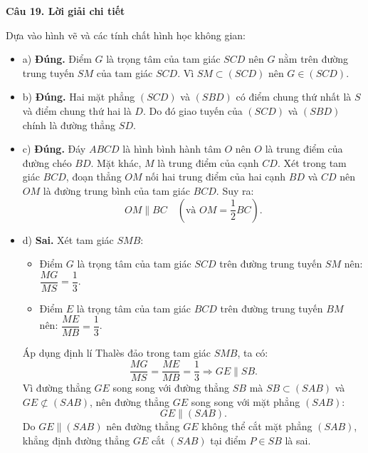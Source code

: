 \documentclass[12pt, a4paper]{article}
\begin{document}
\noindent\textbf{Câu 19. Lời giải chi tiết}\par
\begin{tcolorbox}[enhanced,breakable,colback=solutionbg,colframe=secondary!50!black,frame hidden,borderline west={3pt}{0pt}{secondary!50!black}]
Dựa vào hình vẽ và các tính chất hình học không gian:
\begin{itemize}[leftmargin=1.5em]
\item a) \textbf{Đúng.} Điểm $G$ là trọng tâm của tam giác $SCD$ nên $G$ nằm trên đường trung tuyến $SM$ của tam giác $SCD$. Vì $SM \subset (SCD)$ nên $G \in (SCD)$.

\item b) \textbf{Đúng.} Hai mặt phẳng $(SCD)$ và $(SBD)$ có điểm chung thứ nhất là $S$ và điểm chung thứ hai là $D$. Do đó giao tuyến của $(SCD)$ và $(SBD)$ chính là đường thẳng $SD$.

\item c) \textbf{Đúng.} Đáy $ABCD$ là hình bình hành tâm $O$ nên $O$ là trung điểm của đường chéo $BD$. Mặt khác, $M$ là trung điểm của cạnh $CD$. Xét trong tam giác $BCD$, đoạn thẳng $OM$ nối hai trung điểm của hai cạnh $BD$ và $CD$ nên $OM$ là đường trung bình của tam giác $BCD$. Suy ra:
$$OM \parallel BC\quad \left(\text{và } OM = \dfrac{1}{2}BC\right).$$

\item d) \textbf{Sai.}
Xét tam giác $SMB$:
\begin{itemize}
\item Điểm $G$ là trọng tâm của tam giác $SCD$ trên đường trung tuyến $SM$ nên: $\dfrac{MG}{MS} = \dfrac{1}{3}$.
\item Điểm $E$ là trọng tâm của tam giác $BCD$ trên đường trung tuyến $BM$ nên: $\dfrac{ME}{MB} = \dfrac{1}{3}$.
\end{itemize}
Áp dụng định lí Thalès đảo trong tam giác $SMB$, ta có:
$$\dfrac{MG}{MS} = \dfrac{ME}{MB} = \dfrac{1}{3} \Rightarrow GE \parallel SB.$$
Vì đường thẳng $GE$ song song với đường thẳng $SB$ mà $SB \subset (SAB)$ và $GE \not\subset (SAB)$, nên đường thẳng $GE$ song song với mặt phẳng $(SAB)$:
$$GE \parallel (SAB).$$
Do $GE \parallel (SAB)$ nên đường thẳng $GE$ không thể cắt mặt phẳng $(SAB)$, khẳng định đường thẳng $GE$ cắt $(SAB)$ tại điểm $P \in SB$ là sai.
\end{itemize}
\end{tcolorbox}
\end{document}
